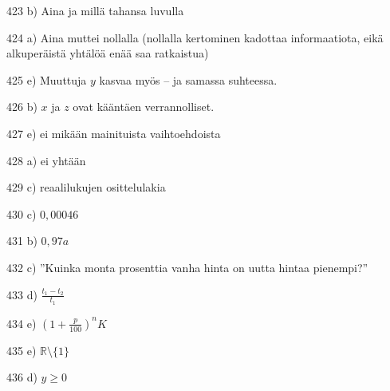 \begin{Vastaus}{423}
b) Aina ja millä tahansa luvulla
	
\end{Vastaus}
\begin{Vastaus}{424}
a) Aina muttei nollalla (nollalla kertominen kadottaa informaatiota, eikä alkuperäistä yhtälöä enää saa ratkaistua)
\end{Vastaus}
\begin{Vastaus}{425}
e) Muuttuja $y$ kasvaa myös -- ja samassa suhteessa.
\end{Vastaus}
\begin{Vastaus}{426}
b) $x$ ja $z$ ovat kääntäen verrannolliset.
	
\end{Vastaus}
\begin{Vastaus}{427}
e) ei mikään mainituista vaihtoehdoista
	
\end{Vastaus}
\begin{Vastaus}{428}
a) ei yhtään
	
\end{Vastaus}
\begin{Vastaus}{429}
	c) reaalilukujen osittelulakia
	
\end{Vastaus}
\begin{Vastaus}{430}
	c) $0,00046$
	
\end{Vastaus}
\begin{Vastaus}{431}
b) $0,97a$
	
\end{Vastaus}
\begin{Vastaus}{432}
c) ''Kuinka monta prosenttia vanha hinta on uutta hintaa pienempi?''
	
\end{Vastaus}
\begin{Vastaus}{433}
d) $\frac{t_1-t_2}{t_1}$
	
\end{Vastaus}
\begin{Vastaus}{434}
e) $(1+\frac{p}{100})^nK$
	
\end{Vastaus}
\begin{Vastaus}{435}
	 e) $\mathbb{R}\setminus \lbrace 1 \rbrace$
    
\end{Vastaus}
\begin{Vastaus}{436}
	 d) $y\geq 0$
    
\end{Vastaus}
